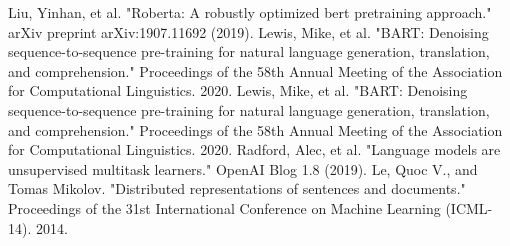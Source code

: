 \documentclass[conference]{IEEEtran}
\begin{document}
\begin{thebibliography}{00}
 Liu, Yinhan, et al. "Roberta: A robustly optimized bert pretraining approach." arXiv preprint arXiv:1907.11692 (2019).
 Lewis, Mike, et al. "BART: Denoising sequence-to-sequence pre-training for natural language generation, translation, and comprehension." Proceedings of the 58th Annual Meeting of the Association for Computational Linguistics. 2020.
 Lewis, Mike, et al. "BART: Denoising sequence-to-sequence pre-training for natural language generation, translation, and comprehension." Proceedings of the 58th Annual Meeting of the Association for Computational Linguistics. 2020.
 Radford, Alec, et al. "Language models are unsupervised multitask learners." OpenAI Blog 1.8 (2019).
 Le, Quoc V., and Tomas Mikolov. "Distributed representations of sentences and documents." Proceedings of the 31st International Conference on Machine Learning (ICML-14). 2014.
\end{thebibliography}
\end{document}
